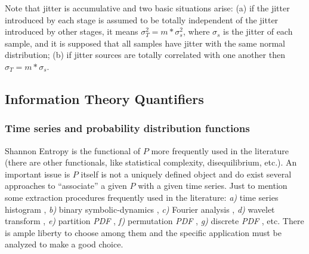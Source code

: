 %
Note that jitter is accumulative and two basic situations arise: (a) if the jitter introduced by each stage is assumed to be totally independent of the jitter introduced by other stages, it means $\sigma_T^2=m*\sigma_s^2$, where $\sigma_s$ is the jitter of each sample, and it is supposed that all samples have jitter with the same normal distribution; (b) if jitter sources are totally correlated with one another then $\sigma_T=m*\sigma_s$. 

\subsection{Information Theory Quantifiers}
\label{sec:quanti}

\subsubsection{Time series and probability distribution functions }
\label{subsec:probabilities}

Shannon Entropy is the functional of $P$ more frequently used in the literature (there are other functionals, like statistical complexity, disequilibrium, etc.). An important issue is $P$ itself is not a uniquely defined object and do exist several approaches to ``associate'' a given $P$ with a given time series. Just to mention some extraction procedures frequently used in the literature: {\it a)\/} time series histogram \cite{Martin2004}, {\it b)\/} binary symbolic-dynamics \cite{Mischaikow1999}, {\it c)\/} Fourier analysis \cite{Powell1979}, {\it d)\/} wavelet transform \cite{Blanco1998,Rosso2001}, {\it e)\/} partition \emph{PDF} \cite{Ebeling2001}, {\it f)\/} permutation \emph{PDF} \cite{Pompe2002,Keller2005}, {\it g)\/} discrete \emph{PDF} \cite{Amigo2007}, etc. There is ample liberty to choose among them and the specific application must be analyzed to make a good choice.

